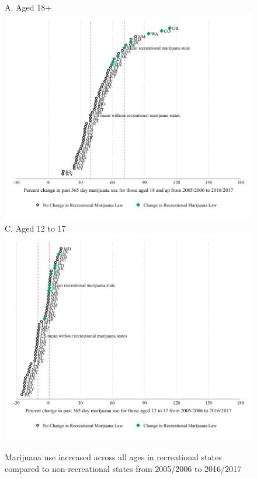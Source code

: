 \documentclass[12pt]{article}%
\begin{document}
\begin{figure}[H]
    \caption{Marijuana use increased across all ages in recreational states compared to non-recreational states from 2005/2006 to 2016/2017}
    \begin{minipage}{\linewidth}
        \begin{minipage}{.49\linewidth}
          A. Aged 18+ \\
          \includegraphics[width=\linewidth]{../output/plots/panel_per_diff_mj_use_365_18.pdf}
          C. Aged 12 to 17 \\
          \includegraphics[width=\linewidth]{../output/plots/panel_per_diff_mj_use_365_12_17.pdf}

\end{minipage}
\end{minipage}
\end{figure}
\end{document}
